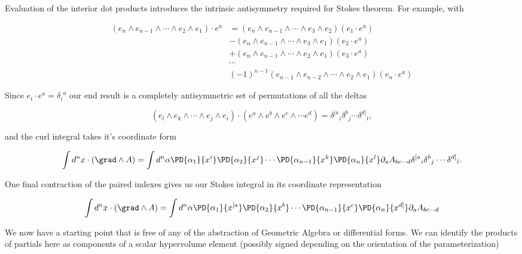 Evaluation of the interior dot products introduces the intrinsic antisymmetry required for Stokes theorem.  For example, with

\begin{align*}
( e_n \wedge e_{n-1} \wedge \cdots \wedge e_2 \wedge e_1 ) \cdot e^a
&=
( e_n \wedge e_{n-1} \wedge \cdots \wedge e_3 \wedge e_2 ) (e_1 \cdot e^a) \\
&-( e_n \wedge e_{n-1} \wedge \cdots \wedge e_3 \wedge e_1 ) (e_2 \cdot e^a) \\
&+( e_n \wedge e_{n-1} \wedge \cdots \wedge e_2 \wedge e_1 ) (e_3 \cdot e^a) \\
&\cdots \\
&(-1)^{n-1}
( e_{n-1} \wedge e_{n-2} \wedge \cdots \wedge e_2 \wedge e_1 ) (e_n \cdot e^a)
\end{align*}

Since $e_i \cdot e^a = {\delta_i}^a$ our end result is a completely antisymmetric set of permutations of all the deltas

\begin{equation}\label{eqn:stokesTensor:n}
( e_l \wedge e_k \wedge \cdots \wedge e_j \wedge e_i )
\cdot
(e^a \wedge e^b \wedge e^c \wedge \cdots e^d)
=
{\delta^{[a}}_i
{\delta^b}_j
\cdots
{\delta^{d]}}_l,
\end{equation}

and the curl integral takes it's coordinate form

\begin{equation}\label{eqn:stokesTensor:n}
\int d^n x \cdot ( \grad \wedge A ) =
\int
d^n \alpha
\PD{\alpha_1}{x^i}
\PD{\alpha_2}{x^j}
\cdots
\PD{\alpha_{n-1}}{x^k}
\PD{\alpha_n}{x^l}
\partial_a A_{b c \cdots d}
{\delta^{[a}}_i
{\delta^b}_j
\cdots
{\delta^{d]}}_l.
\end{equation}

One final contraction of the paired indexes gives us our Stokes integral in its coordinate representation

\begin{equation}\label{eqn:stokesTensor:n}
\int d^n x \cdot ( \grad \wedge A ) =
\int
d^n \alpha
\PD{\alpha_1}{x^{[a}}
\PD{\alpha_2}{x^b}
\cdots
\PD{\alpha_{n-1}}{x^c}
\PD{\alpha_n}{x^{d]}}
\partial_a A_{b c \cdots d}
\end{equation}

We now have a starting point that is free of any of the abstraction of Geometric Algebra or differential forms.  We can identify the products of partials here as components of a scalar hypervolume element (possibly signed depending on the orientation of the parameterization)

